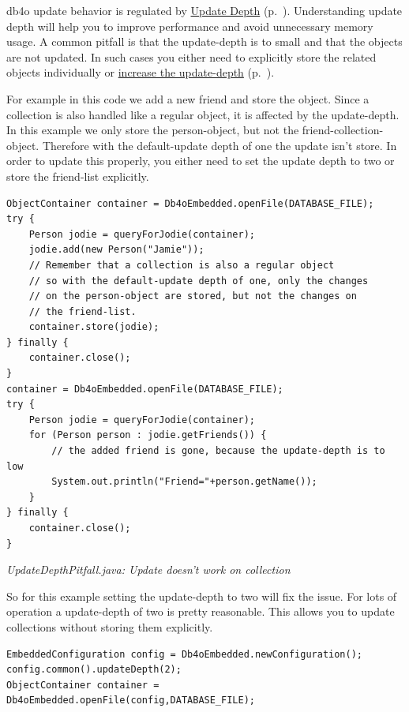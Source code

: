 db4o update behavior is regulated by \hyperref[ref:basics-update-concept]{Update Depth} (p.~\pageref{ref:basics-update-concept}). Understanding update depth will help you to improve performance and avoid unnecessary memory usage. A common pitfall is that the update-depth is to small and that the objects are not updated. In such cases you either need to explicitly store the related objects individually or \hyperref[ref:configuration-common-update-depth]{increase the update-depth} (p.~\pageref{ref:configuration-common-update-depth}).

For example in this code we add a new friend and store the object. Since a collection is also handled like a regular object, it is affected by the update-depth. In this example we only store the person-object, but not the friend-collection-object. Therefore with the default-update depth of one the update isn't store. In order to update this properly, you either need to set the update depth to two or store the friend-list explicitly.

\begin{lstlisting}
ObjectContainer container = Db4oEmbedded.openFile(DATABASE_FILE);
try {
    Person jodie = queryForJodie(container);
    jodie.add(new Person("Jamie"));
    // Remember that a collection is also a regular object
    // so with the default-update depth of one, only the changes
    // on the person-object are stored, but not the changes on
    // the friend-list.
    container.store(jodie);
} finally {
    container.close();
}
container = Db4oEmbedded.openFile(DATABASE_FILE);
try {
    Person jodie = queryForJodie(container);
    for (Person person : jodie.getFriends()) {
        // the added friend is gone, because the update-depth is to low
        System.out.println("Friend="+person.getName());
    }
} finally {
    container.close();
}
\end{lstlisting}

{\small\itshape UpdateDepthPitfall.java: Update doesn't work on collection\par}
\medskip

So for this example setting the update-depth to two will fix the issue. For lots of operation a update-depth of two is pretty reasonable. This allows you to update collections without storing them explicitly.

\begin{lstlisting}
EmbeddedConfiguration config = Db4oEmbedded.newConfiguration();
config.common().updateDepth(2);
ObjectContainer container = Db4oEmbedded.openFile(config,DATABASE_FILE);
\end{lstlisting}

